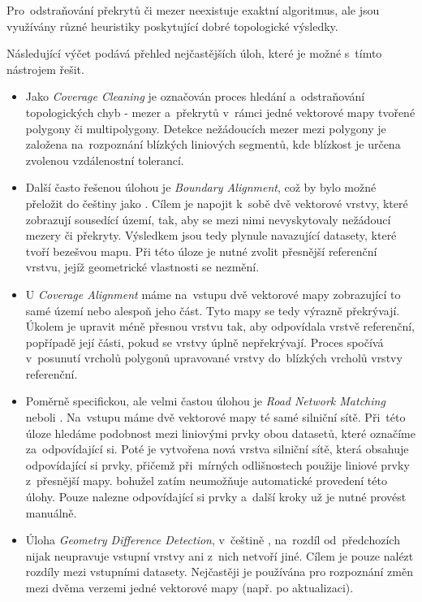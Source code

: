 
Pro~odstraňování překrytů či mezer neexistuje exaktní algoritmus,
ale jsou vy\-užívány různé heuristiky poskytující dobré topologické výsledky.

Následující výčet podává přehled nejčastějších úloh, které je možné 
s~tímto nástrojem řešit.

\begin{itemize}
 \item Jako \textit{Coverage Cleaning} je  označován proces hledání
    a~odstraňování topologických chyb - mezer a~překrytů v~rámci jedné
    vektorové mapy tvořené polygony či multipolygony. Detekce nežádoucích
    mezer mezi polygony je založena na~rozpoznání blízkých liniových segmentů,
    kde blízkost je určena zvolenou vzdálenostní tolerancí. 

 \item Další často řešenou úlohou je \textit{Boundary Alignment}, což by
    bylo možné přeložit do češtiny jako . 
    Cílem je napojit k~sobě dvě vektorové vrstvy, které zobrazují sousedící
    území, tak, aby se mezi nimi nevyskytovaly nežádoucí mezery či překryty.
    Výsledkem jsou tedy plynule navazující datasety, které tvoří bezešvou mapu.
    Při této úloze je nutné zvolit přesnější referenční vrstvu, jejíž 
    geometrické vlastnosti se nezmění.

 \item U \textit{Coverage Alignment} máme na~vstupu dvě vektorové
    mapy zobrazující to samé území nebo alespoň jeho část. Tyto mapy se 
    tedy výrazně překrývají. Úkolem je upravit méně přesnou vrstvu tak,
    aby odpovídala vrstvě referenční, popřípadě její části, pokud se vrstvy
    úplně nepřekrývají. Proces spočívá v~posunutí vrcholů polygonů upravované
    vrstvy do~blízkých vrcholů vrstvy referenční.

 \item Poměrně specifickou, ale velmi častou úlohou je \textit{Road Network 
    Matching} neboli . Na~vstupu máme dvě 
    vektorové mapy té samé silniční sítě. Při~této úloze hledáme podobnost
    mezi liniovými prvky obou datasetů, které označíme za~odpovídající si.
    Poté je vytvořena nová vrstva silniční sítě, která obsahuje odpovídající
    si prvky, přičemž při~mírných odlišnostech použije liniové prvky z~přesnější
    mapy.  bohužel zatím neumožňuje automatické provedení této
    úlohy. Pouze nalezne odpovídající si prvky a~další kroky už je nutné provést
    manuálně.

\item Úloha \textit{Geometry Difference Detection}, v~češtině , na~rozdíl od~předchozích nijak neupravuje vstupní
    vrstvy ani z~nich netvoří jiné. Cílem je pouze nalézt rozdíly mezi vstupními
    datasety. Nejčastěji je používána pro rozpoznání změn mezi dvěma verzemi
    jedné vektorové mapy (např. po aktualizaci).
\end{itemize}

